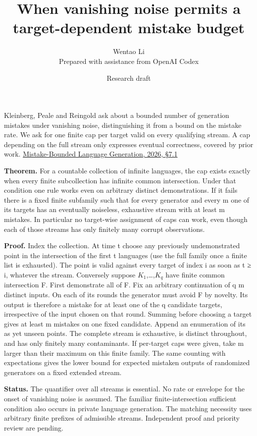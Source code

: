 \documentclass[11pt]{article}
\title{When vanishing noise permits a target-dependent mistake budget}
\author{Wentao Li\\{\small Prepared with assistance from OpenAI Codex}}
\date{Research draft}
\begin{document}
\maketitle
Kleinberg, Peale and Reingold ask about a bounded number of generation mistakes under vanishing noise, distinguishing it from a bound on the mistake rate. We ask for one finite cap per target valid on every qualifying stream. A cap depending on the full stream only expresses eventual correctness, covered by prior work. \href{https://arxiv.org/abs/2605.10809}{Mistake-Bounded Language Generation, 2026, §7.1}

\textbf{Theorem.} For a countable collection of infinite languages, the cap exists exactly when every finite subcollection has infinite common intersection. Under that condition one rule works even on arbitrary distinct demonstrations. If it fails there is a fixed finite subfamily such that for every generator and every m one of its targets has an eventually noiseless, exhaustive stream with at least m mistakes. In particular no target-wise assignment of caps can work, even though each of those streams has only finitely many corrupt observations.

\textbf{Proof.} Index the collection. At time t choose any previously undemonstrated point in the intersection of the first t languages (use the full family once a finite list is exhausted). The point is valid against every target of index i as soon as t ≥ i, whatever the stream. Conversely suppose \(K_{1}\),\ldots,\(K_{q}\) have finite common intersection F. First demonstrate all of F. Fix an arbitrary continuation of q m distinct inputs. On each of its rounds the generator must avoid F by novelty. Its output is therefore a mistake for at least one of the q candidate targets, irrespective of the input chosen on that round. Summing before choosing a target gives at least m mistakes on one fixed candidate. Append an enumeration of its as yet unseen points. The complete stream is exhaustive, is distinct throughout, and has only finitely many contaminants. If per-target caps were given, take m larger than their maximum on this finite family. The same counting with expectations gives the lower bound for expected mistaken outputs of randomized generators on a fixed extended stream.

\textbf{Status.} The quantifier over all streams is essential. No rate or envelope for the onset of vanishing noise is assumed. The familiar finite-intersection sufficient condition also occurs in private language generation. The matching necessity uses arbitrary finite prefixes of admissible streams. Independent proof and priority review are pending.
\end{document}
